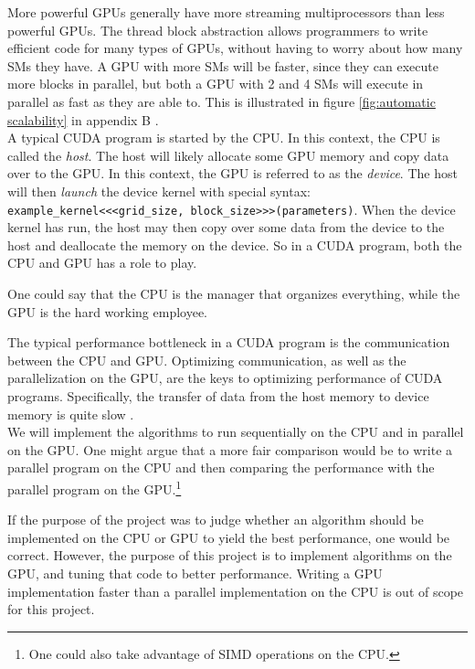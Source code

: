 More powerful GPUs generally have more streaming multiprocessors than less powerful GPUs. The thread block abstraction allows programmers to write efficient code for many types of GPUs, without having to worry about how many SMs they have. A GPU with more SMs will be faster, since they can execute more blocks in parallel, but both a GPU with 2 and 4 SMs will execute in parallel as fast as they are able to. This is illustrated in figure \ref{fig:automatic scalability} in appendix B \cite[Sect. 1.3]{nvidia:cudadoc}.\\

\noindent A typical CUDA program is started by the CPU. In this context, the CPU is called the \textit{host}. The host will likely allocate some GPU memory and copy data over to the GPU. In this context, the GPU is referred to as the \textit{device}. The host will then \textit{launch} the device kernel with special syntax: \texttt{example\_kernel<<<grid\_size, block\_size>>>(parameters)}. When the device kernel has run, the host may then copy over some data from the device to the host and deallocate the memory on the device. So in a CUDA program, both the CPU and GPU has a role to play. 

One could say that the CPU is the manager that organizes everything, while the GPU is the hard working employee.

The typical performance bottleneck in a CUDA program is the communication between the CPU and GPU. Optimizing communication, as well as the parallelization on the GPU, are the keys to optimizing performance of CUDA programs. Specifically, the transfer of data from the host memory to device memory is quite slow \cite[Sect. 5.3.1]{nvidia:cudadoc}.\\

\noindent We will implement the algorithms to run sequentially on the CPU and in parallel on the GPU. One might argue that a more fair comparison would be to write a parallel program on the CPU and then comparing the performance with the parallel program on the GPU.\footnote{One could also take advantage of SIMD operations on the CPU.}

If the purpose of the project was to judge whether an algorithm should be implemented on the CPU or GPU to yield the best performance, one would be correct. However, the purpose of this project is to implement algorithms on the GPU, and tuning that code to better performance. Writing a GPU implementation faster than a parallel implementation on the CPU is out of scope for this project.

